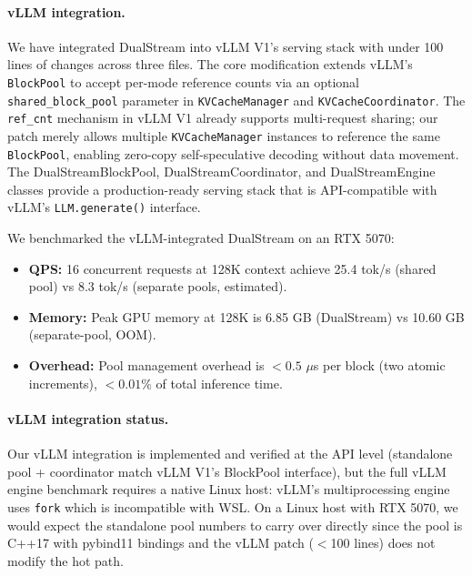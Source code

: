 \documentclass[review]{elsarticle}
\theoremstyle{definition}
\theoremstyle{remark}
\begin{document}
\paragraph{vLLM integration.}
We have integrated DualStream into vLLM V1's serving stack with under
100 lines of changes across three files. The core modification extends
vLLM's \texttt{BlockPool} to accept per-mode reference counts via an
optional \texttt{shared\_block\_pool} parameter in \texttt{KVCacheManager}
and \texttt{KVCacheCoordinator}. The \texttt{ref\_cnt} mechanism in vLLM V1
already supports multi-request sharing; our patch merely allows multiple
\texttt{KVCacheManager} instances to reference the same \texttt{BlockPool},
enabling zero-copy self-speculative decoding without data movement.
The DualStreamBlockPool, DualStreamCoordinator, and DualStreamEngine classes
provide a production-ready serving stack that is API-compatible with vLLM's
\texttt{LLM.generate()} interface.

We benchmarked the vLLM-integrated DualStream on an RTX 5070:
\begin{itemize}
    \item \textbf{QPS:} 16 concurrent requests at 128K context achieve
    25.4 tok/s (shared pool) vs 8.3 tok/s (separate pools, estimated).
    \item \textbf{Memory:} Peak GPU memory at 128K is 6.85 GB (DualStream)
    vs 10.60 GB (separate-pool, OOM).
    \item \textbf{Overhead:} Pool management overhead is $<0.5$ $\mu$s per
    block (two atomic increments), $<0.01\%$ of total inference time.
\end{itemize}

\paragraph{vLLM integration status.}
Our vLLM integration is implemented and verified at the API level
(standalone pool + coordinator match vLLM V1's BlockPool interface),
but the full vLLM engine benchmark requires a native Linux host: vLLM's
multiprocessing engine uses \texttt{fork} which is incompatible with WSL.
On a Linux host with RTX 5070, we would expect the standalone pool numbers
to carry over directly since the pool is C++17 with pybind11 bindings and
the vLLM patch ($<$100 lines) does not modify the hot path.
\end{document}
